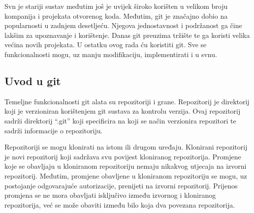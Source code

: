 \documentclass[times, utf8, diplomski, numeric]{fer}
\begin{document}
Svn je stariji sustav međutim još je uvijek široko korišten u velikom broju kompanija i projekata otvorenog koda. Međutim, git je značajno dobio na popularnosti u zadnjem desetljeću. Njegova jednostavnost i podržanost ga čine lakšim za upoznavanje i korištenje. Danas git preuzima tržište te ga koristi velika većina novih projekata. U ostatku ovog rada ću koristiti git. Sve se funkcionalnosti mogu, uz manju modifikaciju, implementirati i u svnu.

\subsection{Uvod u git}

Temeljne funkcionalnosti git alata su repozitoriji i grane. Repozitorij je direktorij koji je verzioniran korištenjem git sustava za kontrolu verzija. Ovaj repozitorij sadrži direktorij “.git” koji specificira na koji se način verzionira repozitori te sadrži informacije o repozitoriju.

Repozitoriji se mogu klonirati na istom ili drugom uređaju. Klonirani repozitorij je novi repozitorij koji sadržava svu povijest kloniranog repozitorija. Promjene koje se obavljaju u kloniranom repozitoriju nemaju nikakvog utjecaja na izvorni repozitorij. Međutim, promjene obavljene u kloniranom repozitoriju se mogu, uz postojanje odgovarajuće autorizacije, prenijeti na izvorni repozitorij. Prijenos promjena se ne mora obavljati isključivo između izvornog i kloniranog repozitorija, već se može obaviti između bilo koja dva povezana repozitorija.
\end{document}

